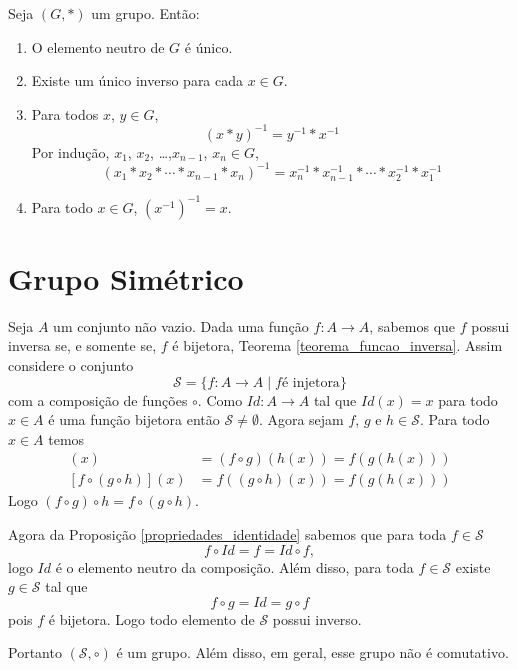 \begin{proposicao}
	Seja $(G,*)$ um grupo. Ent\~ao:
	\begin{enumerate}[label={\roman*})]
		\item O elemento neutro de $G$ {\'e} {\'u}nico.

		\item Existe um {\'u}nico inverso para cada $x \in G$.

		\item Para todos $x$, $y \in G$,
		\[
			(x*y)^{-1} = y^{-1}*x^{-1}
		\]
		Por indu{\c c}{\~a}o, $x_1$, $x_2$, \dots ,$x_{n-1}$, $x_n \in G$,
		\[
			(x_1*x_2*\cdots *x_{n-1}*x_{n})^{-1} = x^{-1}_{n}*x^{-1}_{n-1}*\cdots *x^{-1}_2*x^{-1}_1
		\]
		\item Para todo $x \in G$, $(x^{-1})^{-1} = x$.
	\end{enumerate}
\end{proposicao}


\section{Grupo Sim\'etrico} %
\label{sec:grupo_sim\'etrico}

Seja $A$ um conjunto n\~ao vazio. Dada uma fun\c{c}\~ao $f : A \to A$, sabemos que $f$ possui inversa se, e somente se, $f$ \'e bijetora, Teorema \ref{teorema_funcao_inversa}. Assim considere o conjunto
\[
	\mathcal{S} = \{ f : A \to A \mid f \mbox{\'e injetora}\}
\]
com a composi\c{c}\~ao de fun\c{c}\~oes $\circ$. Como $Id : A \to A$ tal que $Id(x) = x$ para todo $x \in A$ \'e uma fun\c{c}\~ao bijetora ent\~ao $\mathcal{S} \ne \emptyset$. Agora sejam $f$, $g$ e $h \in \mathcal{S}$. Para todo $x \in A$ temos
\begin{align*}
	[(f\circ g)\circ h](x) &= (f \circ g)(h(x)) = f(g(h(x)))\\
	[f\circ(g\circ h)](x) &= f((g\circ h)(x)) = f(g(h(x)))
\end{align*}
Logo $(f\circ g)\circ h = f\circ(g\circ h)$.

Agora da Proposi\c{c}\~ao \ref{propriedades_identidade} sabemos que para toda $f \in \mathcal{S}$
\[
	f\circ Id = f = Id\circ f,
\]
logo $Id$ \'e o elemento neutro da composi\c{c}\~ao. Al\'em disso, para toda $f \in \mathcal{S}$ existe $g \in \mathcal{S}$ tal que
\[
	f\circ g = Id = g \circ f
\]
pois $f$ \'e bijetora. Logo todo elemento de $\mathcal{S}$ possui inverso.

Portanto $(\mathcal{S}, \circ)$ \'e um grupo. Al\'em disso, em geral, esse grupo n\~ao \'e comutativo.

